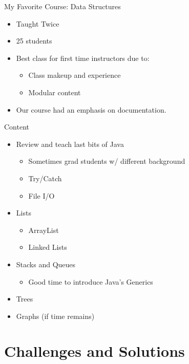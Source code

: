 \documentclass[11pt]{beamer}
\begin{document}
\begin{frame}{My Favorite Course: Data Structures}
	\begin{itemize}
		\item Taught Twice
		\item 25 students
		\item Best class for first time instructors due to:
			\begin{itemize}
				\item Class makeup and experience
				\item Modular content
			\end{itemize}
		\item Our course had an emphasis on documentation. 
	\end{itemize}
	
\end{frame}



\begin{frame}{Content}
	\begin{itemize}
		\item Review and teach last bits of Java
		
		\begin{itemize}
			\item Sometimes grad students w/ different background
			\item Try/Catch
			\item File I/O
		\end{itemize}
		\pause
		\item Lists
		\begin{itemize}
			\item ArrayList
			\item Linked Lists
		\end{itemize}
		\pause
		\item Stacks and Queues
		\begin{itemize}
			\item Good time to introduce Java's Generics
		\end{itemize}
		\pause
		\item Trees
		\pause
		\item Graphs (if time remains)
	\end{itemize}
\end{frame}

\section{Challenges and Solutions}
\end{document}
